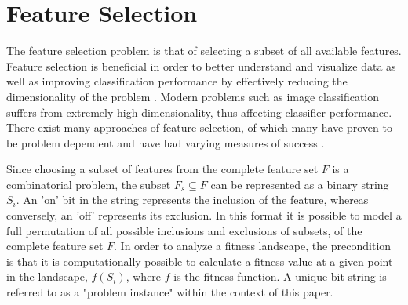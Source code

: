 \documentclass[journal,comsoc]{IEEEtran}
\begin{document}
\section{Feature Selection}
The feature selection problem is that of selecting a subset of all available features. Feature selection is beneficial in order to better understand and visualize data as well as improving classification performance by effectively reducing the dimensionality of the problem \cite{guyon2003introduction}. Modern problems such as image classification suffers from extremely high dimensionality, thus affecting classifier performance. There exist many approaches of feature selection, of which many have proven to be problem dependent and have had varying measures of success \cite{chandrashekar2014survey}.

Since choosing a subset of features from the complete feature set $F$ is a combinatorial problem, the subset $F_s \subseteq F$ can be represented as a binary string $S_i$. An 'on' bit in the string represents the inclusion of the feature, whereas conversely, an 'off' represents its exclusion. In this format it is possible to model a full permutation of all possible inclusions and exclusions of subsets, of the complete feature set $F$. In order to analyze a fitness landscape, the precondition is that it is computationally possible to calculate a fitness value at a given point in the landscape, $f(S_i)$, where $f$ is the fitness function. A unique bit string is referred to as a "problem instance" within the context of this paper.
\end{document}
